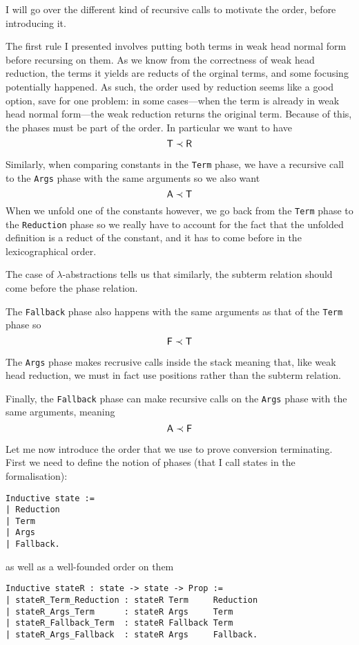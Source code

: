 I will go over the different kind of recursive calls to motivate the order,
before introducing it.

The first rule I presented involves putting both terms in weak head normal
form before recursing on them. As we know from the correctness of weak head
reduction, the terms it yields are reducts of the orginal terms, and some
focusing potentially happened. As such, the order used by reduction seems like
a good option, save for one problem: in some cases---when the term is already
in weak head normal form---the weak reduction returns the original term.
Because of this, the phases must be part of the order.
In particular we want to have
\[
  \mathsf{T} \prec \mathsf{R}
\]

Similarly, when comparing constants in the \texttt{Term} phase,
we have a recursive call to the \texttt{Args} phase with the same
arguments so we also want
\[
  \mathsf{A} \prec \mathsf{T}
\]
When we unfold one of the constants however, we go back from the
\texttt{Term} phase to the \texttt{Reduction} phase
so we really have to account for the fact that the unfolded definition is a
reduct of the constant, and it has to come before in the lexicographical
order.

The case of \(\lambda\)-abstractions tells us that similarly, the subterm
relation should come before the phase relation.

The \texttt{Fallback} phase also happens with the same arguments as
that of the \texttt{Term} phase so
\[
  \mathsf{F} \prec \mathsf{T}
\]

The \texttt{Args} phase makes recrusive calls inside the stack meaning
that, like weak head reduction, we must in fact use positions rather than the
subterm relation.

Finally, the \texttt{Fallback} phase can make recursive calls on the
\texttt{Args} phase with the same arguments, meaning
\[
  \mathsf{A} \prec \mathsf{F}
\]


Let me now introduce the order that we use to prove conversion terminating.
First we need to define the notion of phases (that I call states in the
formalisation):
\begin{verbatim}
Inductive state :=
| Reduction
| Term
| Args
| Fallback.
\end{verbatim}
as well as a well-founded order on them
\begin{verbatim}
Inductive stateR : state -> state -> Prop :=
| stateR_Term_Reduction : stateR Term     Reduction
| stateR_Args_Term      : stateR Args     Term
| stateR_Fallback_Term  : stateR Fallback Term
| stateR_Args_Fallback  : stateR Args     Fallback.
\end{verbatim}

